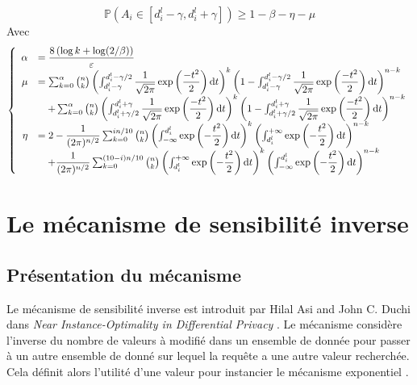 \[
    \mathbb P\left( A_i \in [d_i^l-\gamma, d_i^l + \gamma] \right) \geq 1 - \beta - \eta -\mu    
\]
Avec 
\[
    \left\{ 
        \begin{array}{rl}
            \alpha & = \dfrac{8\left( \log k + \log(2/\beta) \right)}{\varepsilon} \\
            \mu & = \sum_{k = 0}^\alpha \binom{n}{k}\left( \int_{d^l_i - \gamma}^{d^l_i -\gamma/2}\dfrac{1}{\sqrt{2\pi}} \exp\left( \dfrac{-t^2}{2} \right)\mathrm{d} t \right)^k \left( 1 - \int_{d^l_i - \gamma}^{d^l_i -\gamma/2}\dfrac{1}{\sqrt{2\pi}} \exp\left( \dfrac{-t^2}{2} \right)\mathrm{d} t \right)^{n - k}\\
            & \quad + \sum_{k = 0}^\alpha \binom{n}{k}\left( \int_{d^l_i + \gamma/2}^{d^l_i +\gamma}\dfrac{1}{\sqrt{2\pi}} \exp\left( \dfrac{-t^2}{2} \right)\mathrm{d} t \right)^k \left( 1 - \int_{d^l_i + \gamma/2}^{d^l_i +\gamma}\dfrac{1}{\sqrt{2\pi}} \exp\left( \dfrac{-t^2}{2} \right)\mathrm{d} t\right)^{n - k}\\
            \eta & = 2 - \dfrac{1}{(2\pi)^{n/2}}\sum_{k = 0}^{in/10}\binom{n}{k}\left( \int_{-\infty}^{d^l_i}\exp\left( -\dfrac{t^2}{2} \right)\mathrm{d} t \right)^k \left( \int_{d^l_i}^{+\infty}\exp\left( -\dfrac{t^2}{2} \right)\mathrm{d} t  \right)^{n - k}\\
            & \quad + \dfrac{1}{(2\pi)^{n/2}}\sum_{k = 0}^{(10-i)n/10}\binom{n}{k}\left( \int_{d^l_i}^{+\infty}\exp\left( -\dfrac{t^2}{2} \right)\mathrm{d} t \right)^k \left( \int_{-\infty}^{d^l_i}\exp\left( -\dfrac{t^2}{2} \right)\mathrm{d} t  \right)^{n - k} 
        \end{array}
    \right.    
\]



\section{Le mécanisme de sensibilité inverse}

\subsection{Présentation du mécanisme}

Le mécanisme de sensibilité inverse est introduit par {\sc Hilal Asi} and {\sc John C. Duchi} dans \textit{Near Instance-Optimality in Differential Privacy} \cite{Asi2020NearII}. Le mécanisme considère l'inverse du nombre de valeurs à modifié dans un ensemble de donnée pour passer à un autre ensemble de donné sur lequel la requête a une autre valeur recherchée. Cela définit alors l'utilité d'une valeur pour instancier le mécanisme exponentiel \cite{mcsherry2007mechanism}.\\

